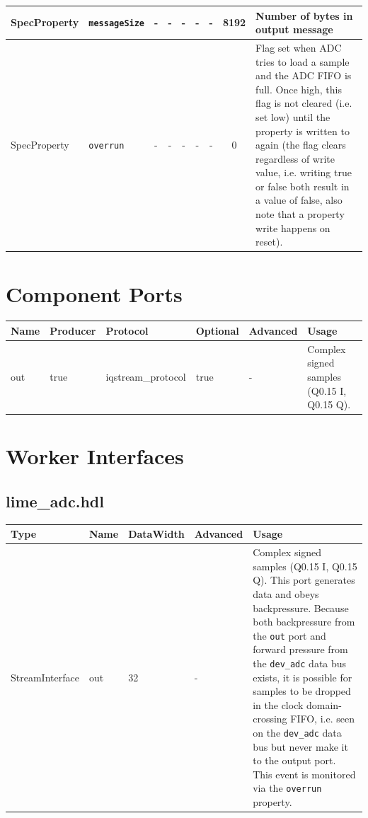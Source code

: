 \documentclass{article}
\def\comp{lime\_adc}
\begin{document}
\begin{landscape}
\begin{scriptsize}
\begin{tabular}{|p{2cm}|p{2cm}|p{1cm}|c|c|c|c|c|p{6.5cm}|}
			\hline
			SpecProperty & \verb+messageSize+   & -    & -              & -               & -             & -                  & 8192    & Number of bytes in output message                                                                                      \\
			\hline
			SpecProperty & \verb+overrun+       & -    & -              & -               & -             & -                  & 0       & Flag set when ADC tries to load a sample and the ADC FIFO is full. Once high, this flag is not cleared (i.e. set low) until the property is written to again (the flag clears regardless of write value, i.e. writing true or false both result in a value of false, also note that a property write happens on reset).                                   \\
			\hline
		\end{tabular}
	\end{scriptsize}

	\section*{Component Ports}
	\begin{scriptsize}
		\begin{tabular}{|p{2cm}|p{1.5cm}|p{4cm}|p{1.5cm}|p{1.5cm}|p{9.38cm}|}
			\hline
			\rowcolor{blue}
			Name & Producer & Protocol           & Optional & Advanced & Usage                  \\
			\hline
			out  & true     & iqstream\_protocol & true     & -        & Complex signed samples (Q0.15 I, Q0.15 Q). \\
			\hline
		\end{tabular}
	\end{scriptsize}
\pagebreak
	\section*{Worker Interfaces}
	\subsection*{\comp.hdl}
	\begin{scriptsize}
		\begin{tabular}{|p{2cm}|p{1.5cm}|p{1.5cm}|p{1.5cm}|p{13.8cm}|}
			\hline
			\rowcolor{blue}
			Type            & Name & DataWidth & Advanced & Usage                  \\
			\hline
			StreamInterface & out  & 32        & -        & Complex signed samples (Q0.15 I, Q0.15 Q). This port generates data and obeys backpressure. Because both backpressure from the \verb+out+ port and forward pressure from the \verb+dev_adc+ data bus exists, it is possible for samples to be dropped in the clock domain-crossing FIFO, i.e. seen on the \verb+dev_adc+ data bus but never make it to the output port. This event is monitored via the \verb+overrun+ property.  \\
			\hline
		\end{tabular}
	\end{scriptsize}


\end{landscape}
\end{document}
